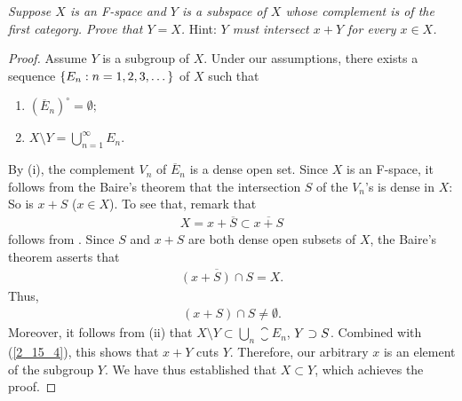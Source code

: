 \textit{%
Suppose $X$ is an F-space and $Y$ is a subspace of $X$ %
whose complement is of the first category. %
Prove that $Y=X$. }Hint: \textit{%
%
  $Y$ must intersect $x+Y$ for every $x\in X$. %
%
}
%
\begin{proof} Assume $Y$ is a subgroup of $X$. %
Under our assumptions, %
there exists a sequence $\{E_n: n=1, 2, 3, \dots\}$ of $X$ such that %
%
  \renewcommand{\labelenumi}{(\roman{enumi})} 
  \begin{enumerate}
    \item ${(\overline{E}_n)}^\circ=\emptyset ;$
    \item $X\setminus Y = \displaystyle{\bigcup_{n=1}^\infty  E_n}$.
  \end{enumerate}
%
By (i), the complement $V_n$ of $\overline{E}_n$ is a dense open set. %
Since $X$ is an F-space, it follows from the Baire's theorem that %
%
  the intersection $S$ of the $V_n$'s is dense in $X$:  %
%
So is $x+S$ ($x\in X$). To see that, remark that %
%
  \begin{align}\label{2_15_2}
    X = x + \overline{S} \subset \overline{x + S}
  \end{align} 
%
follows from . %
Since $S$ and $x+S$ are both dense open subsets of $X$, %
the Baire's theorem asserts that %
%
  \begin{align}
    \overline{(x+S)\cap S} = X.
  \end{align} 
%
Thus, 
%
  \begin{align}\label{2_15_4}
    (x+S)\cap S\neq\emptyset.
  \end{align}
%
Moreover, it follows from (ii) that %
%
  $X\setminus Y \subset \bigcup_n \closure{E}_n$, \ie 
  $Y \supset S$. %
Combined with (\ref{2_15_4}), this shows that $x+Y$ cuts $Y$. 
Therefore, our arbitrary $x$ is an element of the subgroup $Y$. %
We have thus established that $X \subset Y$, which achieves the proof.
\end{proof}
\renewcommand{\labelenumi}{(\alph{enumi})} 
%
